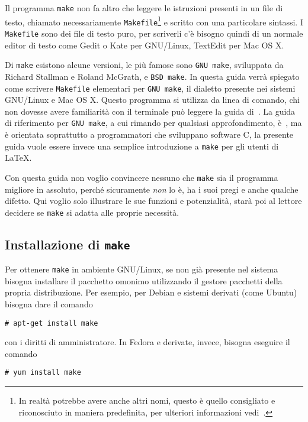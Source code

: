Il programma \texttt{make} non fa altro che leggere le istruzioni presenti in un
file di testo, chiamato necessariamente
\texttt{Makefile}\footnote{In realtà potrebbe avere anche altri nomi, questo è
  quello consigliato e riconosciuto in maniera predefinita, per ulteriori
  informazioni vedi~\textcite[12]{gnu:make}.}
e scritto con una particolare sintassi.  I \texttt{Makefile} sono dei file di
testo puro, per scriverli c'è bisogno quindi di un normale editor di testo come
Gedit o Kate per GNU/Linux, TextEdit per Mac OS X.

Di \texttt{make} esistono alcune versioni, le più famose sono \texttt{GNU make},
sviluppata da Richard Stallman e Roland McGrath, e \texttt{BSD make}.  In questa
guida verrà spiegato come scrivere \texttt{Makefile} elementari per
\texttt{GNU make}, il dialetto presente nei sistemi GNU/Linux e Mac OS X.
Questo programma si utilizza da linea di comando, chi non dovesse avere
familiarità con il terminale può leggere la guida
di~\textcite{giacomelli:console}.  La guida di riferimento per
\texttt{GNU make}, a cui rimando per qualsiasi approfondimento,
è~\textcite{gnu:make}, ma è orientata soprattutto a programmatori che sviluppano
software C, la presente guida vuole essere invece una semplice introduzione a
\texttt{make} per gli utenti di \LaTeX{}.

Con questa guida non voglio convincere nessuno che \texttt{make} sia il
programma migliore in assoluto, perché sicuramente \emph{non} lo è, ha i suoi
pregi e anche qualche difetto.  Qui voglio solo illustrare le sue funzioni e
potenzialità, starà poi al lettore decidere se \texttt{make} si adatta alle
proprie necessità.

\subsection{Installazione di \texttt{make}}
\label{sec:installazione}

Per ottenere \texttt{make} in ambiente GNU/Linux, se non già presente nel
sistema bisogna installare il pacchetto omonimo utilizzando il gestore pacchetti
della propria distribuzione.  Per esempio, per Debian e sistemi derivati (come
Ubuntu) bisogna dare il comando
\begin{verbatim}
# apt-get install make
\end{verbatim}
con i diritti di amministratore.  In Fedora e derivate, invece, bisogna eseguire
il comando
\begin{verbatim}
# yum install make
\end{verbatim}

